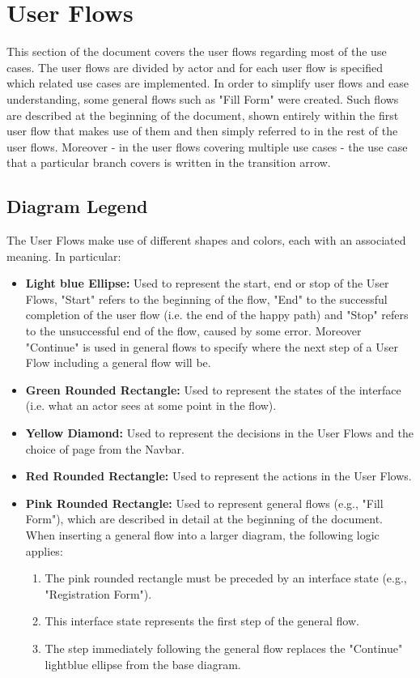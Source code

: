 
\section{User Flows}
This section of the document covers the user flows regarding most of the use cases. The user flows are divided by actor and for each user flow is specified which related use cases are implemented.
In order to simplify user flows and ease understanding, some general flows such as "Fill Form" were created. Such flows are described at the beginning of the document, shown entirely within the first user flow that makes use of them and then simply referred to in the rest of the user flows. Moreover - in the user flows covering multiple use cases - the use case that a particular branch covers is written in the transition arrow.

\subsection{Diagram Legend}
The User Flows make use of different shapes and colors, each with an associated meaning. In particular:
\begin{itemize}
    \item \textbf{Light blue Ellipse: }Used to represent the start, end or stop of the User Flows, "Start" refers to the beginning of the flow, "End" to the successful completion of the user flow (i.e. the end of the happy path) and "Stop" refers to the unsuccessful end of the flow, caused by some error. Moreover "Continue" is used in general flows to specify where the next step of a User Flow including a general flow will be.
    \item \textbf{Green Rounded Rectangle: }Used to represent the states of the interface (i.e. what an actor sees at some point in the flow).
    \item \textbf{Yellow Diamond: }Used to represent the decisions in the User Flows and the choice of page from the Navbar.
    \item \textbf{Red Rounded Rectangle: }Used to represent the actions in the User Flows.
    \item \textbf{Pink Rounded Rectangle: }Used to represent general flows (e.g., "Fill Form"), which are described in detail at the beginning of the document. When inserting a general flow into a larger diagram, the following logic applies:
        \begin{enumerate}
            \item The pink rounded rectangle must be preceded by an interface state (e.g., "Registration Form").
            \item This interface state represents the first step of the general flow.
            \item The step immediately following the general flow replaces the "Continue" lightblue ellipse from the base diagram.
        \end{enumerate}
\end{itemize}

